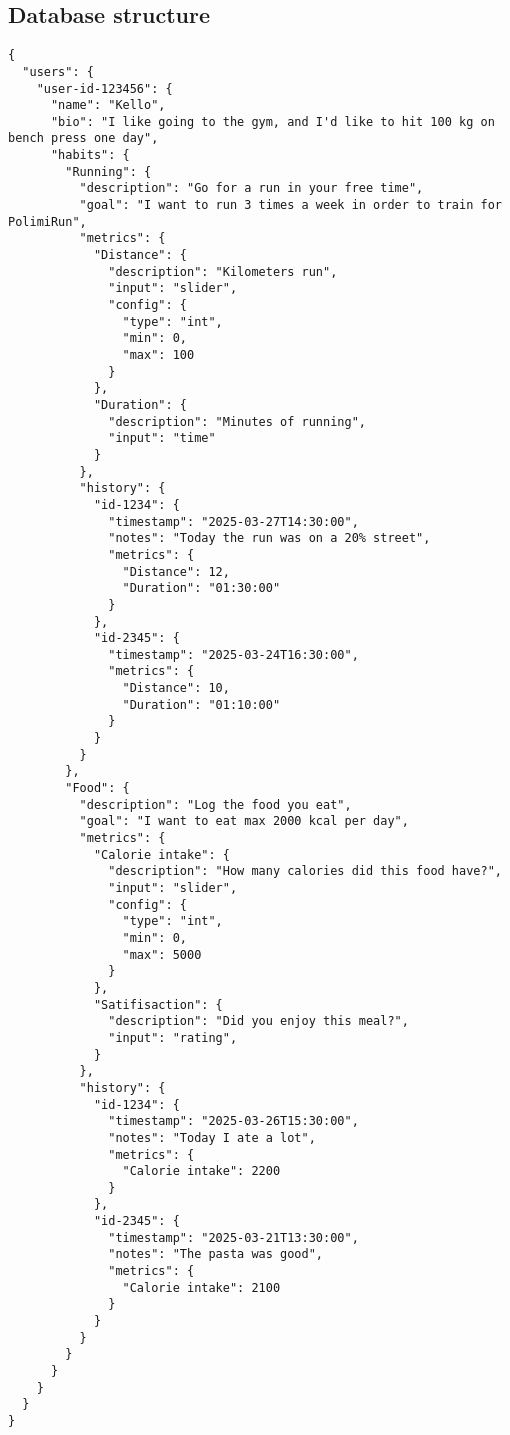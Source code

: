 \documentclass{article}
\begin{document}
\newpage
\subsection{Database structure}

\begin{verbatim}
{
  "users": {
    "user-id-123456": {
      "name": "Kello",
      "bio": "I like going to the gym, and I'd like to hit 100 kg on bench press one day",
      "habits": {
        "Running": {
          "description": "Go for a run in your free time",
          "goal": "I want to run 3 times a week in order to train for PolimiRun",
          "metrics": {
            "Distance": {
              "description": "Kilometers run",
              "input": "slider",
              "config": {
                "type": "int",
                "min": 0,
                "max": 100
              }
            },
            "Duration": {
              "description": "Minutes of running",
              "input": "time"
            }
          },
          "history": {
            "id-1234": {
              "timestamp": "2025-03-27T14:30:00",
              "notes": "Today the run was on a 20% street",
              "metrics": {
                "Distance": 12,
                "Duration": "01:30:00"
              }
            },
            "id-2345": {
              "timestamp": "2025-03-24T16:30:00",
              "metrics": {
                "Distance": 10,
                "Duration": "01:10:00"
              }
            }
          }
        },
        "Food": {
          "description": "Log the food you eat",
          "goal": "I want to eat max 2000 kcal per day",
          "metrics": {
            "Calorie intake": {
              "description": "How many calories did this food have?",
              "input": "slider",
              "config": {
                "type": "int",
                "min": 0,
                "max": 5000
              }
            },
            "Satifisaction": {
              "description": "Did you enjoy this meal?",
              "input": "rating",
            }
          },
          "history": {
            "id-1234": {
              "timestamp": "2025-03-26T15:30:00",
              "notes": "Today I ate a lot",
              "metrics": {
                "Calorie intake": 2200
              }
            },
            "id-2345": {
              "timestamp": "2025-03-21T13:30:00",
              "notes": "The pasta was good",
              "metrics": {
                "Calorie intake": 2100
              }
            }
          }
        }
      }
    }
  }
}
\end{verbatim}
\end{document}
